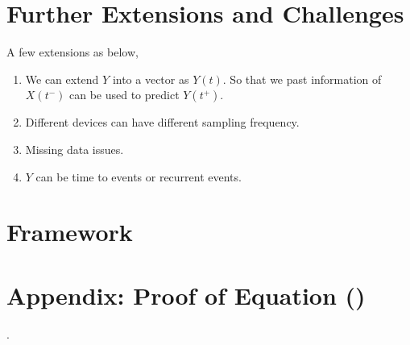 \documentclass[12pt]{article}
\begin{document}
\section{Further Extensions and Challenges}
A few extensions as below,
\begin{enumerate}
	\item We can extend $Y$ into a vector as $Y(t)$. So that we past information of $X(t^-)$ can be used to predict $Y(t^+)$.
	\item Different devices can have different sampling frequency. 
	\item Missing data issues. 
	\item $Y$ can be time to events or recurrent events.
\end{enumerate}
\section{Framework}



\section*{Appendix: Proof of Equation ()}.






\end{document}
